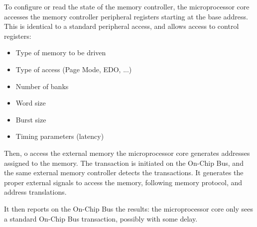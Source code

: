 \documentclass[a4paper,11pt]{article}
\begin{document}
\par\smallskip

To configure or read the state of the memory controller, the microprocessor core accesses the memory controller peripheral registers starting at the base address.
This is identical to a standard peripheral access, and allows access to control registers:
\begin{itemize}
\item Type of memory to be driven
\item Type of access (Page Mode, EDO, ...)
\item Number of banks
\item Word size
\item Burst size
\item Timing parameters (latency)
\end{itemize}

\par\smallskip

Then, o access the external memory the microprocessor core generates addresses assigned to the memory.
The transaction is initiated on the On-Chip Bus, and the same external memory controller detects the transactions.
It generates the proper external signals to access the memory, following memory protocol, and address translations.

It then reports on the On-Chip Bus the results: the microprocessor core only sees a standard On-Chip Bus transaction, possibly with some delay.
\end{document}
